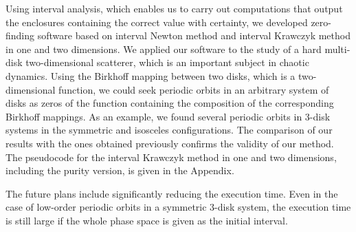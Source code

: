 \documentclass[pre, amsmath, amssymb, onecolumn, showpacs]{revtex4-1}
\begin{document}
Using interval analysis, which enables us to carry out computations that output the enclosures containing the correct value with certainty, we developed zero-finding software based on interval Newton method and interval Krawczyk method in one and two dimensions. We applied our software to the study of a hard multi-disk two-dimensional scatterer, which is an important subject in chaotic dynamics. Using the Birkhoff mapping between two disks, which is a two-dimensional function, we could seek periodic orbits in an arbitrary system of disks as zeros of the function containing the composition of the corresponding Birkhoff mappings. As an example, we found several periodic orbits in 3-disk systems in the symmetric and isosceles configurations. The comparison of our results with the ones obtained previously confirms the validity of our method. The pseudocode for the interval Krawczyk method in one and two dimensions, including the purity version, is given in the Appendix.

The future plans include significantly reducing the execution time. Even in the case of low-order periodic orbits in a symmetric 3-disk system, the execution time is still large if the whole phase space is given as the initial interval.











\vspace*{10pt}




\end{document}
